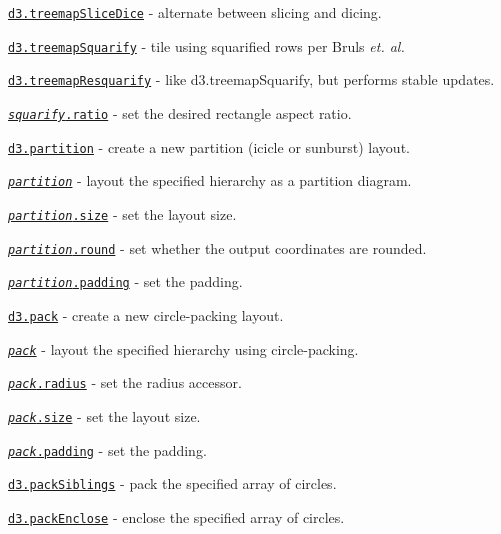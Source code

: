\begin{DoxyItemize}
\item \href{https://github.com/d3/d3-hierarchy/blob/master/README.md#treemapSliceDice}{\tt d3.\+treemap\+Slice\+Dice} -\/ alternate between slicing and dicing.
\item \href{https://github.com/d3/d3-hierarchy/blob/master/README.md#treemapSquarify}{\tt d3.\+treemap\+Squarify} -\/ tile using squarified rows per Bruls {\itshape et. al.}
\item \href{https://github.com/d3/d3-hierarchy/blob/master/README.md#treemapResquarify}{\tt d3.\+treemap\+Resquarify} -\/ like d3.\+treemap\+Squarify, but performs stable updates.
\item \href{https://github.com/d3/d3-hierarchy/blob/master/README.md#squarify_ratio}{\tt {\itshape squarify}.ratio} -\/ set the desired rectangle aspect ratio.
\item \href{https://github.com/d3/d3-hierarchy/blob/master/README.md#partition}{\tt d3.\+partition} -\/ create a new partition (icicle or sunburst) layout.
\item \href{https://github.com/d3/d3-hierarchy/blob/master/README.md#_partition}{\tt {\itshape partition}} -\/ layout the specified hierarchy as a partition diagram.
\item \href{https://github.com/d3/d3-hierarchy/blob/master/README.md#partition_size}{\tt {\itshape partition}.size} -\/ set the layout size.
\item \href{https://github.com/d3/d3-hierarchy/blob/master/README.md#partition_round}{\tt {\itshape partition}.round} -\/ set whether the output coordinates are rounded.
\item \href{https://github.com/d3/d3-hierarchy/blob/master/README.md#partition_padding}{\tt {\itshape partition}.padding} -\/ set the padding.
\item \href{https://github.com/d3/d3-hierarchy/blob/master/README.md#pack}{\tt d3.\+pack} -\/ create a new circle-\/packing layout.
\item \href{https://github.com/d3/d3-hierarchy/blob/master/README.md#_pack}{\tt {\itshape pack}} -\/ layout the specified hierarchy using circle-\/packing.
\item \href{https://github.com/d3/d3-hierarchy/blob/master/README.md#pack_radius}{\tt {\itshape pack}.radius} -\/ set the radius accessor.
\item \href{https://github.com/d3/d3-hierarchy/blob/master/README.md#pack_size}{\tt {\itshape pack}.size} -\/ set the layout size.
\item \href{https://github.com/d3/d3-hierarchy/blob/master/README.md#pack_padding}{\tt {\itshape pack}.padding} -\/ set the padding.
\item \href{https://github.com/d3/d3-hierarchy/blob/master/README.md#packSiblings}{\tt d3.\+pack\+Siblings} -\/ pack the specified array of circles.
\item \href{https://github.com/d3/d3-hierarchy/blob/master/README.md#packEnclose}{\tt d3.\+pack\+Enclose} -\/ enclose the specified array of circles.
\end{DoxyItemize}

